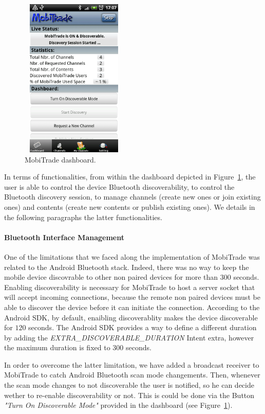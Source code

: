 \begin{figure}[!h]
\begin{center}
\includegraphics[width=2in,height=3in]{Chapitre6/Dashboard.png}
\end{center}
\caption{MobiTrade dashboard.}
\label{dashboard}
\end{figure}

In terms of functionalities, from within the dashboard depicted in Figure~\ref{dashboard}, the user is able to control the device Bluetooth discoverability, to control 
the Bluetooth discovery session, to manage channels (create new ones or join existing ones) and contents (create new contents or publish existing ones). We details in the following paragraphs the latter functionalities.

\paragraph{Bluetooth Interface Management}

One of the limitations that we faced along the implementation of MobiTrade was related to the Android Bluetooth stack. Indeed, there
was no way to keep the mobile device discovrable to other non paired devices for more than 300 seconds. Enabling discoverability is necessary for MobiTrade to host a server socket that will accept incoming connections, because the remote non paired devices must be able to discover the device before it can initiate the connection. According to the Android SDK, by default, enaibling discoverablity makes the device discoverable for $120$ seconds. The Android SDK provides a way to define a different duration by adding the \emph{EXTRA\_DISCOVERABLE\_DURATION} Intent extra, however the maximum duration is fixed to 300 seconds.

In order to overcome the latter limitation, we have added a broadcast receiver to MobiTrade to catch Android Bluetooth scan mode changements. Then, whenever the scan mode changes to not discoverable the user is notified, so he can decide wether to re-enable discoverability or not. This is could be done via the Button \emph{"Turn On Discoverable Mode"} provided in the dashboard (see Figure~\ref{dashboard}).


